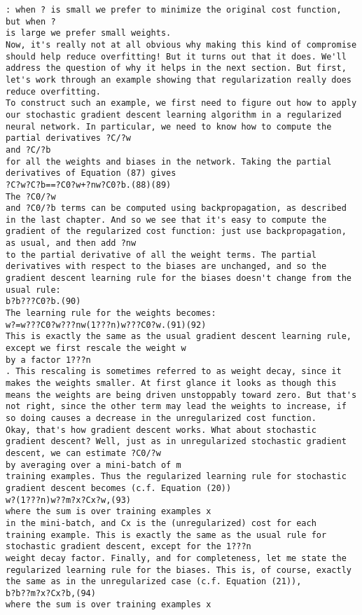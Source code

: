 \begin{lstlisting}
: when ? is small we prefer to minimize the original cost function, but when ?
is large we prefer small weights.
Now, it's really not at all obvious why making this kind of compromise should help reduce overfitting! But it turns out that it does. We'll address the question of why it helps in the next section. But first, let's work through an example showing that regularization really does reduce overfitting.
To construct such an example, we first need to figure out how to apply our stochastic gradient descent learning algorithm in a regularized neural network. In particular, we need to know how to compute the partial derivatives ?C/?w
and ?C/?b
for all the weights and biases in the network. Taking the partial derivatives of Equation (87) gives
?C?w?C?b==?C0?w+?nw?C0?b.(88)(89)
The ?C0/?w
and ?C0/?b terms can be computed using backpropagation, as described in the last chapter. And so we see that it's easy to compute the gradient of the regularized cost function: just use backpropagation, as usual, and then add ?nw
to the partial derivative of all the weight terms. The partial derivatives with respect to the biases are unchanged, and so the gradient descent learning rule for the biases doesn't change from the usual rule:
b?b???C0?b.(90)
The learning rule for the weights becomes:
w?=w???C0?w???nw(1???n)w???C0?w.(91)(92)
This is exactly the same as the usual gradient descent learning rule, except we first rescale the weight w
by a factor 1???n
. This rescaling is sometimes referred to as weight decay, since it makes the weights smaller. At first glance it looks as though this means the weights are being driven unstoppably toward zero. But that's not right, since the other term may lead the weights to increase, if so doing causes a decrease in the unregularized cost function.
Okay, that's how gradient descent works. What about stochastic gradient descent? Well, just as in unregularized stochastic gradient descent, we can estimate ?C0/?w
by averaging over a mini-batch of m
training examples. Thus the regularized learning rule for stochastic gradient descent becomes (c.f. Equation (20))
w?(1???n)w??m?x?Cx?w,(93)
where the sum is over training examples x
in the mini-batch, and Cx is the (unregularized) cost for each training example. This is exactly the same as the usual rule for stochastic gradient descent, except for the 1???n
weight decay factor. Finally, and for completeness, let me state the regularized learning rule for the biases. This is, of course, exactly the same as in the unregularized case (c.f. Equation (21)),
b?b??m?x?Cx?b,(94)
where the sum is over training examples x

\end{lstlisting}
